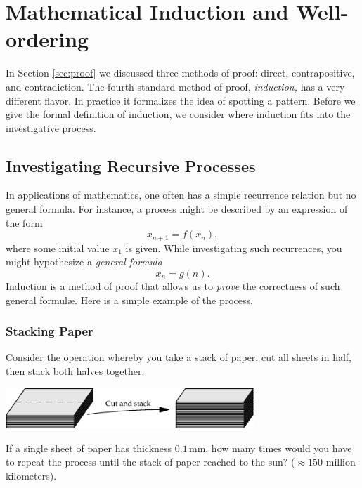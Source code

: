 \graphicspath{{notes/5induction/}}
\section{Mathematical Induction and Well-ordering}\label{sec:ind}

\iffalse

In Section \ref{sec:proof} we discussed three methods of proof: direct, contrapositive, and contradiction. The fourth standard method of proof, \emph{induction,} has a very different flavor. In practice it formalizes the idea of spotting a pattern. Before we give the formal definition of induction, we consider where induction fits into the investigative process.

\subsection{Investigating Recursive Processes}

In applications of mathematics, one often has a simple recurrence relation but no general formula. For instance, a process might be described by an expression of the form
\[x_{n+1}=f(x_n),\]
where some initial value $x_1$ is given. While investigating such recurrences, you might hypothesize a \emph{general formula}
\[x_n=g(n).\]
Induction is a method of proof that allows us to \emph{prove} the correctness of such general formulæ. Here is a simple example of the process.

\subsubsection*{Stacking Paper}

Consider the operation whereby you take a stack of paper, cut all sheets in half, then stack both halves together.
\begin{center}
\includegraphics[width=0.7\textwidth]{induction-02-paper}
\end{center}
If a single sheet of paper has thickness $0.1$\,mm, how many times would you have to repeat the process until the stack of paper reached to the sun? ($\approx 150$ million kilometers).\\

